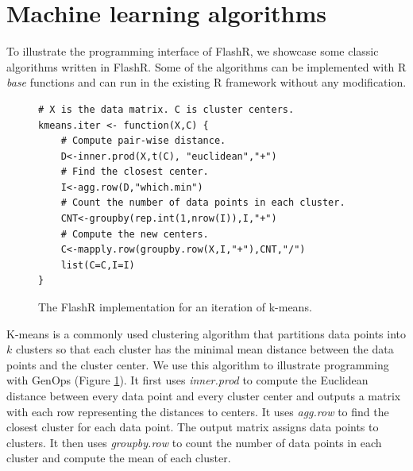 \section{Machine learning algorithms} \label{sec:apps}
To illustrate the programming interface of FlashR, we showcase some classic
algorithms written in FlashR.
Some of the algorithms can be implemented with R \textit{base} functions and
can run in the existing R framework without any modification.

\begin{figure}
\centering
	\footnotesize
	\begin{verbatim}
# X is the data matrix. C is cluster centers.
kmeans.iter <- function(X,C) {
	# Compute pair-wise distance.
	D<-inner.prod(X,t(C), "euclidean","+")
	# Find the closest center.
	I<-agg.row(D,"which.min")
	# Count the number of data points in each cluster.
	CNT<-groupby(rep.int(1,nrow(I)),I,"+")
	# Compute the new centers.
	C<-mapply.row(groupby.row(X,I,"+"),CNT,"/")
	list(C=C,I=I)
}
	\end{verbatim}
\vspace{-10pt}
	\caption{The FlashR implementation for an iteration of k-means.}
	\label{fig:kmeans}
\vspace{-10pt}
\end{figure}

K-means is a commonly used clustering algorithm that partitions data points
into $k$ clusters so that each cluster has the minimal mean distance between
the data points and the cluster center. We use this algorithm
to illustrate programming with GenOps (Figure \ref{fig:kmeans}).
It first uses \textit{inner.prod} to
compute the Euclidean distance between every data point and every cluster center
and outputs a matrix with each row representing the distances to centers.  
It uses \textit{agg.row} to find the closest
cluster for each data point.  The output matrix 
assigns data points to clusters. It then uses \textit{groupby.row} to count
the number of data points in each cluster and compute the mean of each cluster.

